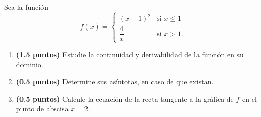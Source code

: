
Sea la función
\[
f(x)=\begin{cases}
(x+1)^2 & \text{si }x\leq1\\[5pt]
\dfrac{4}{x} & \text{si }x>1.
\end{cases}
\]
\begin{enumerate}[label=\alph*)]
\item \textbf{(1.5 puntos)} Estudie la continuidad y derivabilidad de la función en su dominio.
\item \textbf{(0.5 puntos)} Determine sus asíntotas, en caso de que existan.
\item \textbf{(0.5 puntos)} Calcule la ecuación de la recta tangente a la gráfica de $f$ en el punto de abscisa $x=2$.
\end{enumerate}
